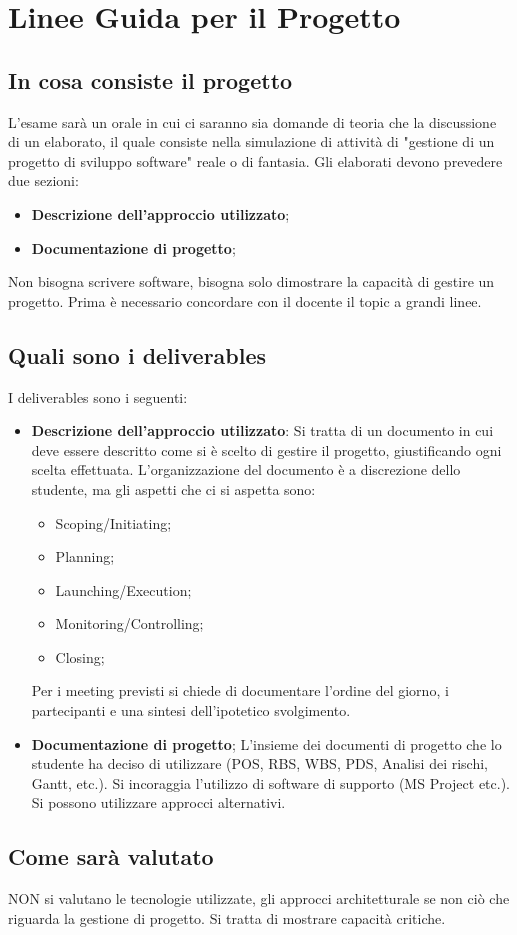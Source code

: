 \section{Linee Guida per il Progetto}
\subsection{In cosa consiste il progetto}
L'esame sarà un orale in cui ci saranno sia domande di teoria che la discussione di un elaborato, il quale consiste nella simulazione di attività di "gestione di un progetto di sviluppo software" reale o di fantasia.\newline
Gli elaborati devono prevedere due sezioni:
\begin{itemize}
	\item \textbf{Descrizione dell'approccio utilizzato};
	\item \textbf{Documentazione di progetto};
\end{itemize}
Non bisogna scrivere software, bisogna solo dimostrare la capacità di gestire un progetto. Prima è necessario concordare con il docente il topic a grandi linee.
\subsection{Quali sono i deliverables}
I deliverables sono i seguenti:
\begin{itemize}
	\item \textbf{Descrizione dell'approccio utilizzato}: Si tratta di un documento in cui deve essere descritto come si è scelto di gestire il progetto, giustificando ogni scelta effettuata. L'organizzazione del documento è a discrezione dello studente, ma gli aspetti che ci si aspetta sono:
	\begin{itemize}
		\item Scoping/Initiating;
		\item Planning;
		\item Launching/Execution;
		\item Monitoring/Controlling;
		\item Closing;
	\end{itemize}
	Per i meeting previsti si chiede di documentare l'ordine del giorno, i partecipanti e una sintesi dell'ipotetico svolgimento.
	\item \textbf{Documentazione di progetto}; L'insieme dei documenti di progetto che lo studente ha deciso di utilizzare (POS, RBS, WBS, PDS, Analisi dei rischi, Gantt, etc.).\newline
	Si incoraggia l'utilizzo di software di supporto (MS Project etc.). Si possono utilizzare approcci alternativi.
\end{itemize}
\subsection{Come sarà valutato}
NON si valutano le tecnologie utilizzate, gli approcci architetturale se non ciò che riguarda la gestione di progetto. Si tratta di mostrare capacità critiche.
